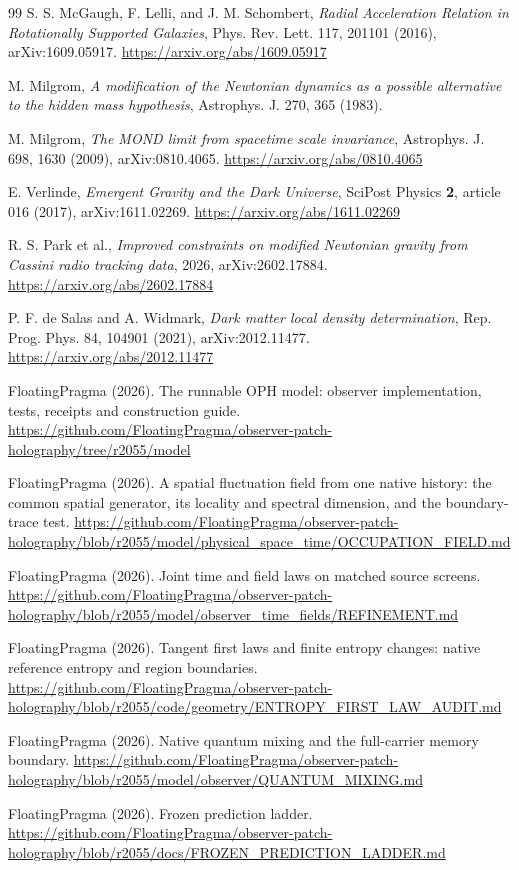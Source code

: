 \documentclass[11pt]{article}
\begin{document}
\begin{thebibliography}{99}
S. S. McGaugh, F. Lelli, and J. M. Schombert,
\emph{Radial Acceleration Relation in Rotationally Supported Galaxies},
Phys. Rev. Lett. 117, 201101 (2016), arXiv:1609.05917.
\url{https://arxiv.org/abs/1609.05917}

M. Milgrom,
\emph{A modification of the Newtonian dynamics as a possible alternative to the hidden mass hypothesis},
Astrophys. J. 270, 365 (1983).

M. Milgrom,
\emph{The MOND limit from spacetime scale invariance},
Astrophys. J. 698, 1630 (2009), arXiv:0810.4065.
\url{https://arxiv.org/abs/0810.4065}

E. Verlinde,
\emph{Emergent Gravity and the Dark Universe},
SciPost Physics \textbf{2}, article 016 (2017), arXiv:1611.02269.
\url{https://arxiv.org/abs/1611.02269}

R. S. Park et al.,
\emph{Improved constraints on modified Newtonian gravity from Cassini radio tracking data},
2026, arXiv:2602.17884.
\url{https://arxiv.org/abs/2602.17884}

P. F. de Salas and A. Widmark,
\emph{Dark matter local density determination},
Rep. Prog. Phys. 84, 104901 (2021), arXiv:2012.11477.
\url{https://arxiv.org/abs/2012.11477}

FloatingPragma (2026). The runnable OPH model: observer implementation,
tests, receipts and construction guide.
\url{https://github.com/FloatingPragma/observer-patch-holography/tree/r2055/model}

FloatingPragma (2026). A spatial fluctuation field from one native history:
the common spatial generator, its locality and spectral dimension, and the
boundary-trace test.
\url{https://github.com/FloatingPragma/observer-patch-holography/blob/r2055/model/physical_space_time/OCCUPATION_FIELD.md}

FloatingPragma (2026). Joint time and field laws on matched source screens.
\url{https://github.com/FloatingPragma/observer-patch-holography/blob/r2055/model/observer_time_fields/REFINEMENT.md}

FloatingPragma (2026). Tangent first laws and finite entropy changes:
native reference entropy and region boundaries.
\url{https://github.com/FloatingPragma/observer-patch-holography/blob/r2055/code/geometry/ENTROPY_FIRST_LAW_AUDIT.md}

FloatingPragma (2026). Native quantum mixing and the full-carrier memory
boundary.
\url{https://github.com/FloatingPragma/observer-patch-holography/blob/r2055/model/observer/QUANTUM_MIXING.md}

FloatingPragma (2026). Frozen prediction ladder.
\url{https://github.com/FloatingPragma/observer-patch-holography/blob/r2055/docs/FROZEN_PREDICTION_LADDER.md}

\end{thebibliography}
\end{document}
